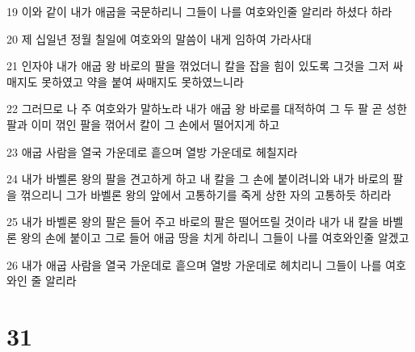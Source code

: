 \par 19 이와 같이 내가 애굽을 국문하리니 그들이 나를 여호와인줄 알리라 하셨다 하라
\par 20 제 십일년 정월 칠일에 여호와의 말씀이 내게 임하여 가라사대
\par 21 인자야 내가 애굽 왕 바로의 팔을 꺾었더니 칼을 잡을 힘이 있도록 그것을 그저 싸매지도 못하였고 약을 붙여 싸매지도 못하였느니라
\par 22 그러므로 나 주 여호와가 말하노라 내가 애굽 왕 바로를 대적하여 그 두 팔 곧 성한 팔과 이미 꺾인 팔을 꺾어서 칼이 그 손에서 떨어지게 하고
\par 23 애굽 사람을 열국 가운데로 흩으며 열방 가운데로 헤칠지라
\par 24 내가 바벨론 왕의 팔을 견고하게 하고 내 칼을 그 손에 붙이려니와 내가 바로의 팔을 꺾으리니 그가 바벨론 왕의 앞에서 고통하기를 죽게 상한 자의 고통하듯 하리라
\par 25 내가 바벨론 왕의 팔은 들어 주고 바로의 팔은 떨어뜨릴 것이라 내가 내 칼을 바벨론 왕의 손에 붙이고 그로 들어 애굽 땅을 치게 하리니 그들이 나를 여호와인줄 알겠고
\par 26 내가 애굽 사람을 열국 가운데로 흩으며 열방 가운데로 헤치리니 그들이 나를 여호와인 줄 알리라

\chapter{31}

